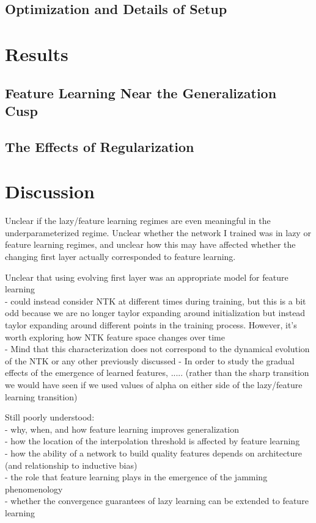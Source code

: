 \documentclass[a4paper, 11pt]{article}
\begin{document}
\subsection{Optimization and Details of Setup}

\section{Results}
\subsection{Feature Learning Near the Generalization Cusp}
\subsection{The Effects of Regularization}

\section{Discussion}

Unclear if the lazy/feature learning regimes are even meaningful in the underparameterized regime.
Unclear whether the network I trained was in lazy or feature learning regimes, and unclear how this may have affected whether the changing first layer actually corresponded to feature learning.

Unclear that using evolving first layer was an appropriate model for feature learning\\
- could instead consider NTK at different times during training, but this is a bit odd because we are no longer taylor expanding around initialization but instead taylor expanding around different points in the training process. However, it's worth exploring how NTK feature space changes over time\\
- Mind that this characterization does not correspond to the dynamical evolution of the NTK or any other previously discussed 
- In order to study the gradual effects of the emergence of learned features, ..... (rather than the sharp transition we would have seen if we used values of alpha on either side of the lazy/feature learning transition)

Still poorly understood:\\

- why, when, and how feature learning improves generalization\\
- how the location of the interpolation threshold is affected by feature learning\\
- how the ability of a network to build quality features depends on architecture (and relationship to inductive bias) \\
- the role that feature learning plays in the emergence of the jamming phenomenology\\
- whether the convergence guarantees of lazy learning can be extended to feature learning
\end{document}
